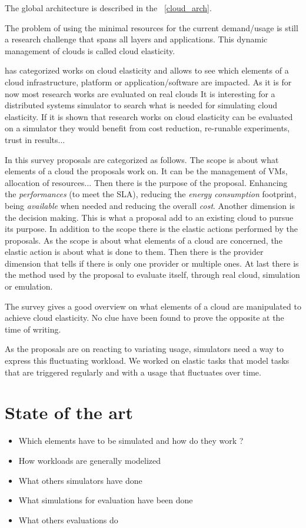 \documentclass[a4paper]{IEEEtran}
\begin{document}
  The global architecture is described in the \figurename~\ref{cloud_arch}.
  
  The problem of using the minimal resources for the current demand/usage is
  still a research challenge that spans all layers and applications. This
  dynamic management of clouds is called cloud elasticity.
  
  \cite{Naskos2016} has categorized works on cloud elasticity and allows to see
  which elements of a cloud infrastructure, platform or application/software are
  impacted. As it is for now most research works are evaluated on real clouds It
  is interesting for a distributed systems simulator to search what is needed
  for simulating cloud elasticity. If it is shown that research works on cloud
  elasticity can be evaluated on a simulator they would benefit from cost
  reduction, re-runable experiments, trust in results...
  
  In this survey proposals are categorized as follows. The scope is about what
  elements of a cloud the proposals work on. It can be the management of VMs,
  allocation of resources... Then there is the purpose of the proposal.
  Enhancing the \textit{performances} (to meet the SLA), reducing the
  \textit{energy consumption} footprint, being \textit{available} when needed
  and reducing the overall \textit{cost}. Another dimension is the decision
  making. This is what a proposal add to an existing cloud to pursue its
  purpose. In addition to the scope there is the elastic actions performed by
  the proposals. As the scope is about what elements of a cloud are concerned,
  the elastic action is about what is done to them. Then there is the provider
  dimension that tells if there is only one provider or multiple ones. At last
  there is the method used by the proposal to evaluate itself, through real
  cloud, simulation or emulation.
  
  The survey gives a good overview on what elements of a cloud are
  manipulated to achieve cloud elasticity. No clue have been found to prove the 
  opposite at the time of writing.
  
  As the proposals are on reacting to variating usage, simulators need a way to
  express this fluctuating workload. We worked on elastic tasks that model tasks
  that are triggered regularly and with a usage that fluctuates over time.


\section{State of the art} \label{sota}
  \begin{itemize}
    \item Which elements have to be simulated and how do they work ?
    \item How workloads are generally modelized
    \item What others simulators have done
    \item What simulations for evaluation have been done
    \item What others evaluations do
  \end{itemize}
  
\end{document}
